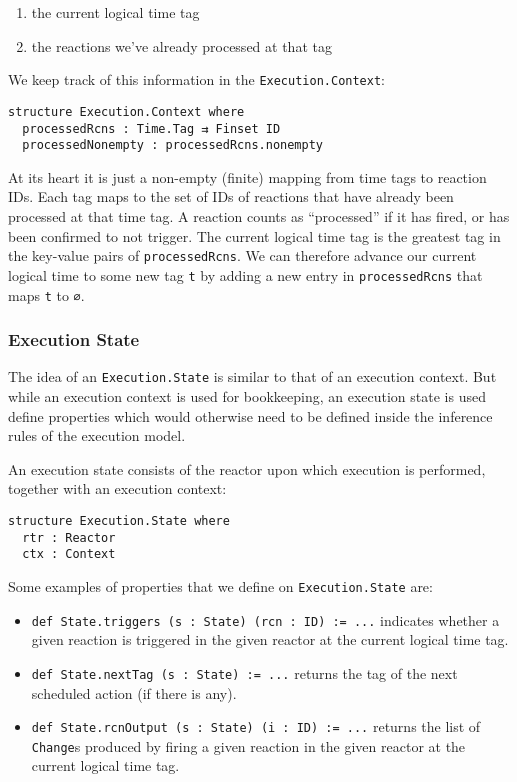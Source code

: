 \begin{enumerate}
  \item the current logical time tag
  \item the reactions we've already processed at that tag
\end{enumerate}

We keep track of this information in the \lstinline{Execution.Context}:

\begin{lstlisting}
structure Execution.Context where
  processedRcns : Time.Tag ⇉ Finset ID
  processedNonempty : processedRcns.nonempty
\end{lstlisting}

At its heart it is just a non-empty (finite) mapping from time tags to reaction IDs.
Each tag maps to the set of IDs of reactions that have already been processed at that time tag.
A reaction counts as ``processed'' if it has fired, or has been confirmed to not trigger.
The current logical time tag is the greatest tag in the key-value pairs of \lstinline{processedRcns}.
We can therefore advance our current logical time to some new tag \lstinline{t} by adding a new entry in \lstinline{processedRcns} that maps \lstinline{t} to \lstinline{∅}.

\subsubsection{Execution State}

The idea of an \lstinline{Execution.State} is similar to that of an execution context.
But while an execution context is used for bookkeeping, an execution state is used define properties which would otherwise need to be defined inside the inference rules of the execution model.

An execution state consists of the reactor upon which execution is performed, together with an execution context:

\begin{lstlisting}
structure Execution.State where
  rtr : Reactor
  ctx : Context
\end{lstlisting}

Some examples of properties that we define on \lstinline{Execution.State} are:

\begin{itemize}
  \item \lstinline{def State.triggers (s : State) (rcn : ID) := ...} indicates whether a given reaction is triggered in the given reactor at the current logical time tag. 
  \item \lstinline{def State.nextTag (s : State) := ...} returns the tag of the next scheduled action (if there is any). 
  \item \lstinline{def State.rcnOutput (s : State) (i : ID) := ...} returns the list of \lstinline{Change}s produced by firing a given reaction in the given reactor at the current logical time tag.
\end{itemize}

